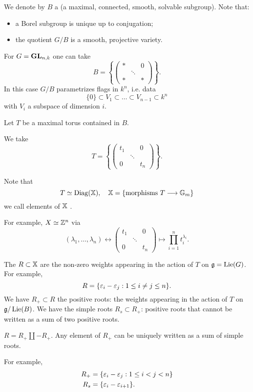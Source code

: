 We denote by $B$ a  (a maximal, connected, smooth, solvable subgroup). Note that:
\begin{itemize}
	\item a Borel subgroup is unique up to conjugation;
	\item the quotient $G /B$ is a smooth, projective variety.
\end{itemize}
\begin{example}
	 For $G=\mathbf{GL}_{n,k}$ one can take
	 \[
		 B = \left\{ \begin{pmatrix} * & & 0 \\ & \ddots & \\ * & & *\end{pmatrix}  \right\} .
	 \] 
	 In this case $G /B$ parametrizes flags in $k^{n}$, i.e. data
	 \[
	  \{0\} \subset V_1\subset \dots\subset V_{n-1}\subset k^{n}
	 \]
	 with $V_i$ a subspace of dimension $i$.
\end{example}
Let $T$ be a maximal torus contained in $B$. 
\begin{example}
	We take
	\[
		T = \left\{ \begin{pmatrix} t_1 & & 0 \\ & \ddots \\ 0 & & t_n \end{pmatrix}  \right\} .
	\] 
\end{example}
Note that
\[
T\isoto \Diag(\XX),\quad \XX = \{\text{morphisms }T\to \Gm\} 
\] 
we call elements of $\mathbb{X}$ . 
\begin{example}
	For example, $X\simeq \mathbb Z^{n}$ via
	\[
		(\lambda_1,\dots,\lambda_n) \leftrightarrow \begin{pmatrix} t_1 & & 0 \\ & \ddots \\ 0 & & t_n \end{pmatrix} \mapsto \prod_{i=1}^{n} t_i^{\lambda_i} .
	\] 
\end{example}
The  $R\subset \mathbb{X}$ are the non-zero weights appearing in the action of $T$ on $\mathfrak g=\operatorname{Lie}(G)$. For example,
\[
R = \{\varepsilon_i - \varepsilon_j: 1\le i\neq j \le n\} .
\] 
We have $R_+\subset R$ the positive roots: the weights appearing in the action of $T$ on $\mathfrak g /\operatorname{Lie}(B)$. We have the simple roots $R_s\subset R_+$: positive roots that cannot be written as a sum of two positive roots.
\begin{note}
	$R=R_+ \coprod -R_{+}$. Any element of $R_+$ can be uniquely written as a sum of simple roots.
\end{note}
For example,
\begin{align*}
	R_+ &= \{\varepsilon_i - \varepsilon_j:1\le i<j<n\} \\
	R_s &= \{\varepsilon_i - \varepsilon_{i+1}\} .
\end{align*}

